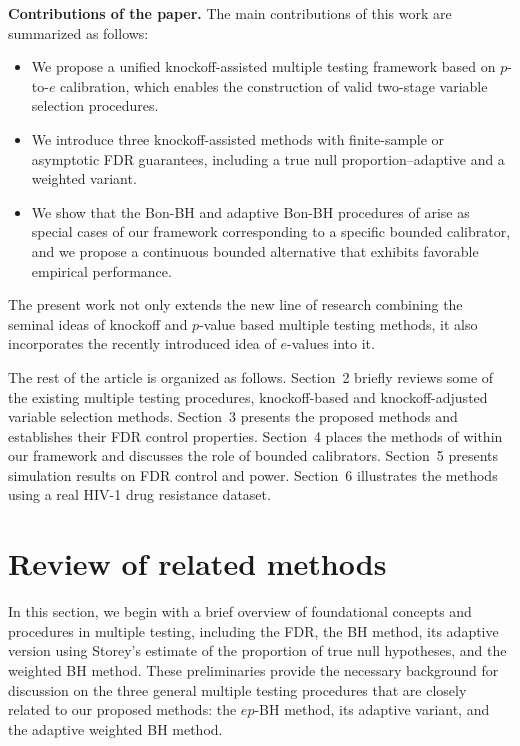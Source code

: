 \documentclass[11pt]{article}
\numberwithin{equation}{section}
\theoremstyle{plain}
\theoremstyle{remark}
\begin{document}
\noindent\textbf{Contributions of the paper.}
The main contributions of this work are summarized as follows:
\begin{itemize}
    \item We propose a unified knockoff-assisted multiple testing framework based on $p$-to-$e$ calibration, which enables the construction of valid two-stage variable selection procedures.
    \item We introduce three knockoff-assisted methods with finite-sample or asymptotic FDR guarantees, including a true null proportion–adaptive and a weighted variant.
    \item We show that the Bon-BH and adaptive Bon-BH procedures of \citet{sarkar2022adjusting} arise as special cases of our framework corresponding to a specific bounded calibrator, and we propose a continuous bounded alternative that exhibits favorable empirical performance.
\end{itemize}

The present work not only extends the new line of research combining the seminal ideas of knockoff and $p$-value based multiple testing methods, it also incorporates the recently introduced idea of $e$-values into it. 

The rest of the article is organized as follows. Section~2 briefly reviews some of the existing multiple testing procedures, knockoff-based and knockoff-adjusted variable selection methods. Section~3 presents the proposed methods and establishes their FDR control properties. Section~4 places the methods of \citet{sarkar2022adjusting} within our framework and discusses the role of bounded calibrators. Section~5 presents simulation results on FDR control and power. Section~6 illustrates the methods using a real HIV-1 drug resistance dataset.

\section{Review of related methods}

In this section, we begin with a brief overview of foundational concepts and procedures in multiple testing, including the FDR, the BH method, its adaptive version using Storey’s estimate of the proportion of true null hypotheses, and the weighted BH method. These preliminaries provide the necessary background for discussion on the three general multiple testing procedures that are closely related to our proposed methods: the \(ep\)-BH method, its adaptive variant, and the adaptive weighted BH method.
\end{document}
